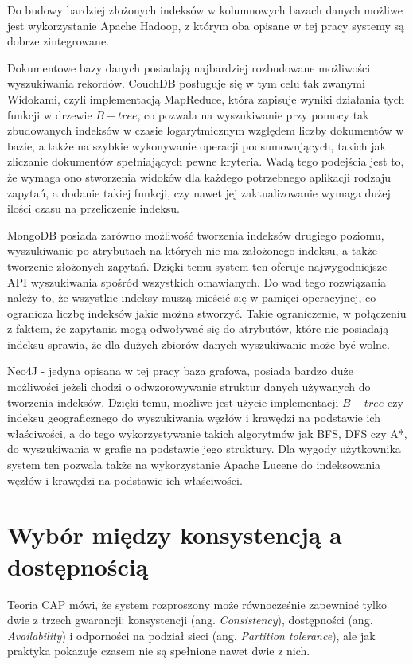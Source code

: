Do budowy bardziej złożonych indeksów w kolumnowych bazach danych możliwe jest wykorzystanie Apache Hadoop, z którym oba opisane w tej pracy systemy są dobrze zintegrowane.

Dokumentowe bazy danych posiadają najbardziej rozbudowane możliwości wyszukiwania rekordów.
CouchDB posługuje się w tym celu tak zwanymi Widokami, czyli implementacją MapReduce, która zapisuje wyniki działania tych funkcji w drzewie $B-tree$, co pozwala na wyszukiwanie przy pomocy tak zbudowanych indeksów w czasie logarytmicznym względem liczby dokumentów w bazie, a także na szybkie wykonywanie operacji podsumowujących, takich jak zliczanie dokumentów spełniających pewne kryteria.
Wadą tego podejścia jest to, że wymaga ono stworzenia widoków dla każdego potrzebnego aplikacji rodzaju zapytań, a dodanie takiej funkcji, czy nawet jej zaktualizowanie wymaga dużej ilości czasu na przeliczenie indeksu.

MongoDB posiada zarówno możliwość tworzenia indeksów drugiego poziomu, wyszukiwanie po atrybutach na których nie ma założonego indeksu, a także tworzenie złożonych zapytań.
Dzięki temu system ten oferuje najwygodniejsze API wyszukiwania spośród wszystkich omawianych.
Do wad tego rozwiązania należy to, że wszystkie indeksy muszą mieścić się w pamięci operacyjnej, co ogranicza liczbę indeksów jakie można stworzyć.
Takie ograniczenie, w połączeniu z faktem, że zapytania mogą odwoływać się do atrybutów, które nie posiadają indeksu sprawia, że dla dużych zbiorów danych wyszukiwanie może być wolne.

Neo4J - jedyna opisana w tej pracy baza grafowa, posiada bardzo duże możliwości jeżeli chodzi o odwzorowywanie struktur danych używanych do tworzenia indeksów.
Dzięki temu, możliwe jest użycie implementacji $B-tree$ czy indeksu geograficznego do wyszukiwania węzłów i krawędzi na podstawie ich właściwości, a do tego wykorzystywanie takich algorytmów jak BFS, DFS czy A*, do wyszukiwania w grafie na podstawie jego struktury.
Dla wygody użytkownika system ten pozwala także na wykorzystanie Apache Lucene do indeksowania węzłów i krawędzi na podstawie ich właściwości.

\section{Wybór między konsystencją a dostępnością}

Teoria CAP mówi, że system rozproszony może równocześnie zapewniać tylko dwie z trzech gwarancji: konsystencji (ang. \emph{Consistency}), dostępności (ang. \emph{Availability}) i odporności na podział sieci (ang. \emph{Partition tolerance}), ale jak praktyka pokazuje czasem nie są spełnione nawet dwie z nich.

